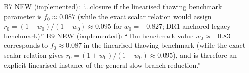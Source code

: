 B7 NEW (implemented): ``...closure if the linearised thawing
benchmark parameter is $f_0\approx0.087$ (while the exact scalar
relation would assign $r_0=(1+w_0)/(1-w_0)\approx0.095$ for
$w_0=-0.827$; DR1-anchored legacy benchmark).''
B9 NEW (implemented): ``The benchmark value $w_0\approx-0.83$
corresponds to $f_0\approx0.087$ in the linearised thawing
benchmark (while the exact scalar relation gives
$r_0=(1+w_0)/(1-w_0)\approx0.095$), and is therefore an explicit
linearised instance of the general slow-branch reduction.''
